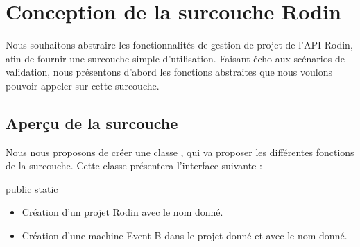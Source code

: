 \chapter{Conception de la surcouche Rodin}

Nous souhaitons abstraire les fonctionnalités de gestion de projet de l'API Rodin, afin de fournir une surcouche simple d'utilisation.
Faisant écho aux scénarios de validation, nous présentons d'abord les fonctions abstraites que nous voulons pouvoir appeler sur cette surcouche.


\section{Aperçu de la surcouche}

Nous nous proposons de créer une classe , qui va proposer les différentes fonctions de la surcouche.
Cette classe présentera l'interface suivante :


\vspace{\baselineskip}
\begin{labeling}{public static}
    \setlength{\itemsep}{1.5em}

    \item [\javacode{public static}] 
        \begin{itemize}[label={}]
            \item Création d'un projet Rodin avec le nom donné.
        \end{itemize}

    \item [\javacode{public static}] 
        \begin{itemize}[label={}]
            \item Création d'une machine Event-B dans le projet donné et avec le nom donné.
        \end{itemize}

\end{labeling}
